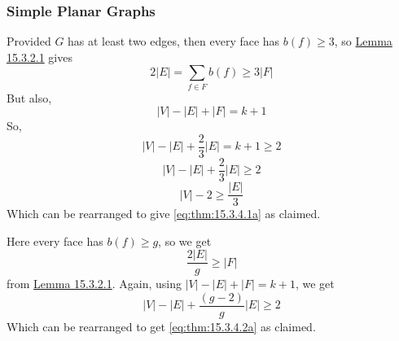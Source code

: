 \subsubsection{Simple Planar Graphs}

{Provided \(G\) has at least two edges, then every face has \(b(f) \geq 3\), so \hyperref[lem:15.3.2.1]{Lemma 15.3.2.1} gives
\begin{equation}
    2|E| = \sum_{f \in F} b(f) \geq 3|F|
\end{equation}
But also, 
\begin{equation}
    |V| - |E| + |F| = k+1
\end{equation}
So,
\begin{equation*}
    |V| - |E| + \frac{2}{3}|E| = k+1 \geq 2
\end{equation*}
\begin{equation*}
    |V| - |E| + \frac{2}{3}|E| \geq 2
\end{equation*}
\begin{equation*}
    |V| - 2 \geq \frac{|E|}{3}
\end{equation*}
Which can be rearranged to give \eqref{eq:thm:15.3.4.1a} as claimed.}


\newpage\noindent{}

{Here every face has \(b(f) \geq g\), so we get
\begin{equation}
    \frac{2|E|}{g} \geq |F|
\end{equation}
from \hyperref[lem:15.3.2.1]{Lemma 15.3.2.1}. Again, using \(|V| - |E| + |F| = k+1\), we get
\begin{equation}
    |V| - |E| + \frac{(g-2)}{g}|E| \geq 2
\end{equation}
Which can be rearranged to get \eqref{eq:thm:15.3.4.2a} as claimed.}

